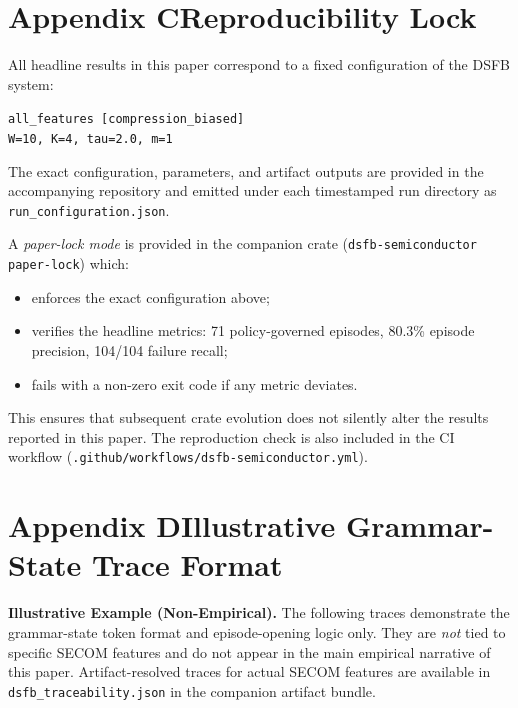 \documentclass[11pt,letterpaper]{article}
\theoremstyle{scresult}
\begin{document}
\section*{Appendix C\quad Reproducibility Lock}
\label{app:repro-lock}

\noindent All headline results in this paper correspond to a fixed configuration
of the DSFB system:

\begin{center}\small
\texttt{all\_features [compression\_biased]}\\
\texttt{W=10, K=4, tau=2.0, m=1}
\end{center}

\noindent The exact configuration, parameters, and artifact outputs are
provided in the accompanying repository and emitted under each timestamped
run directory as \texttt{run\_configuration.json}.

A \emph{paper-lock mode} is provided in the companion crate
(\texttt{dsfb-semiconductor paper-lock}) which:
\begin{itemize}
  \item enforces the exact configuration above;
  \item verifies the headline metrics: 71 policy-governed episodes, 80.3\%
        episode precision, 104/104 failure recall;
  \item fails with a non-zero exit code if any metric deviates.
\end{itemize}

\noindent This ensures that subsequent crate evolution does not silently alter
the results reported in this paper. The reproduction check is also included in
the CI workflow (\texttt{.github/workflows/dsfb-semiconductor.yml}).

\clearpage
\section*{Appendix D\quad Illustrative Grammar-State Trace Format}
\label{app:trace-format}

\textbf{Illustrative Example (Non-Empirical).}
The following traces demonstrate the grammar-state token format and
episode-opening logic only. They are \emph{not} tied to specific SECOM features
and do not appear in the main empirical narrative of this paper.
Artifact-resolved traces for actual SECOM features are available in
\texttt{dsfb\_traceability.json} in the companion artifact bundle.
\end{document}
